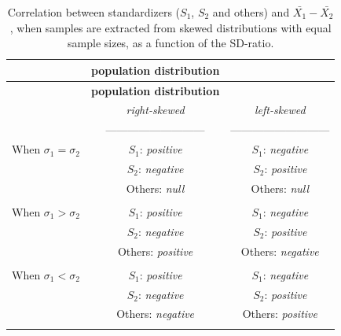 \documentclass[
  english,
  man,mask,floatsintext]{apa6}
\begin{document}
\begin{longtable}[]{@{}lcc@{}}
\caption{Correlation between standardizers (\(S_1\), \(S_2\) and others) and \(\bar{X_1}-\bar{X_2}\), when samples are extracted from skewed distributions with equal sample sizes, as a function of the SD-ratio.}\tabularnewline
\toprule
& \textbf{\textbf{population distribution}} & \\
\midrule
\endfirsthead
\toprule
& \textbf{\textbf{population distribution}} & \\
\midrule
\endhead
& \emph{right-skewed} & \emph{left-skewed} \\
& --------------------------- & --------------------------- \\
When \(\sigma_1=\sigma_2\) & \(S_1\): \emph{positive} & \(S_1\): \emph{negative} \\
& \(S_2\): \emph{negative} & \(S_2\): \emph{positive} \\
& Others: \emph{null} & Others: \emph{null} \\
& & \\
When \(\sigma_1>\sigma_2\) & \(S_1\): \emph{positive} & \(S_1\): \emph{negative} \\
& \(S_2\): \emph{negative} & \(S_2\): \emph{positive} \\
& Others: \emph{positive} & Others: \emph{negative} \\
& & \\
When \(\sigma_1<\sigma_2\) & \(S_1\): \emph{positive} & \(S_1\): \emph{negative} \\
& \(S_2\): \emph{negative} & \(S_2\): \emph{positive} \\
& Others: \emph{negative} & Others: \emph{positive} \\
& & \\
\bottomrule
\end{longtable}
\end{document}
